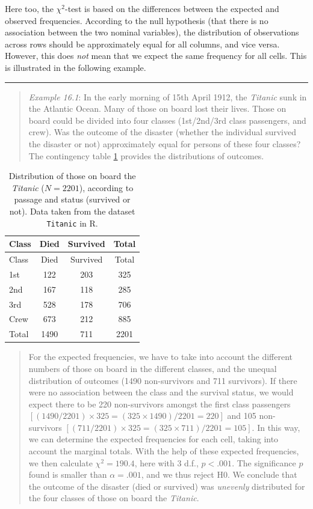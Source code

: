 \documentclass[
]{book}
\begin{document}
Here too, the \(\chi^2\)-test is based on the differences between the expected and
observed frequencies. According to the null hypothesis (that there is no association
between the two nominal variables), the distribution of observations across
rows should be approximately equal for all columns, and vice versa. However, this
does \emph{not} mean that we expect the same frequency for all cells.
This is illustrated in the following example.

\begin{center}\rule{0.5\linewidth}{0.5pt}\end{center}

\begin{quote}
\emph{Example 16.1}: In the early morning of 15th April 1912, the \emph{Titanic}
sunk in the Atlantic Ocean. Many of those on board lost their lives.
Those on board could be divided into four classes (1st/2nd/3rd class passengers, and crew). Was the outcome of the disaster (whether the individual survived the
disaster or not) approximately equal for persons of these four classes?
The contingency table \ref{tab:titanic} provides the distributions of
outcomes.
\end{quote}

\begin{longtable}[]{@{}lccc@{}}
\caption{\label{tab:titanic} Distribution of those on board the \emph{Titanic} (\(N=2201\)),
according to passage
and status (survived or not). Data taken from the dataset
\texttt{Titanic} in R.}\tabularnewline
\toprule
Class & Died & Survived & Total \\
\midrule
\endfirsthead
\toprule
Class & Died & Survived & Total \\
\midrule
\endhead
1st & 122 & 203 & 325 \\
2nd & 167 & 118 & 285 \\
3rd & 528 & 178 & 706 \\
Crew & 673 & 212 & 885 \\
Total & 1490 & 711 & 2201 \\
\bottomrule
\end{longtable}

\begin{quote}
For the expected frequencies, we have to take into account
the different numbers of those on board in the different classes,
and the unequal distribution of outcomes (1490 non-survivors and 711
survivors). If there were no association between the class and the survival
status, we would expect there to be 220 non-survivors amongst the first class
passengers \([(1490/2201) \times 325 = (325 \times 1490) / 2201 = 220]\)
and 105 non-survivors \([(711/2201) \times 325 = (325 \times 711) / 2201 = 105]\). In this way, we can determine the expected frequencies for each cell,
taking into account the marginal totals. With the help of these
expected frequencies, we then calculate \(\chi^2=190.4\), here with 3 d.f.,
\(p<.001\). The significance \(p\) found is smaller than \(\alpha=.001\), and
we thus reject H0. We conclude that the outcome of the disaster (died or survived)
was \emph{unevenly} distributed for the four classes of those on board the \emph{Titanic}.
\end{quote}
\end{document}

